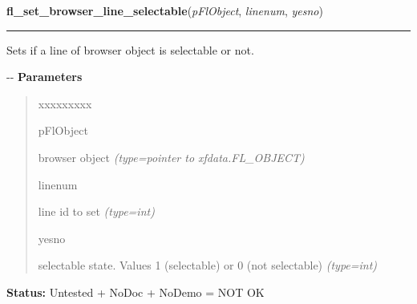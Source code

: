 \hspace{.8\funcindent}\begin{boxedminipage}{\funcwidth}

    \raggedright \textbf{fl\_set\_browser\_line\_selectable}(\textit{pFlObject}, \textit{linenum}, \textit{yesno})

    \vspace{-1.5ex}

    \rule{\textwidth}{0.5\fboxrule}
\setlength{\parskip}{2ex}

Sets if a line of browser object is selectable or not.

-{}-
\setlength{\parskip}{1ex}
      \textbf{Parameters}
      \vspace{-1ex}

      \begin{quote}
        \begin{Ventry}{xxxxxxxxx}

          \item[pFlObject]


browser object
            {\it (type=pointer to xfdata.FL\_OBJECT)}

          \item[linenum]


line id to set
            {\it (type=int)}

          \item[yesno]


selectable state. Values 1 (selectable) or 0 (not selectable)
            {\it (type=int)}

        \end{Ventry}

      \end{quote}

\textbf{Status:} 
Untested + NoDoc + NoDemo = NOT OK


    \end{boxedminipage}

    \label{xformslib:flbrowser:fl_get_browser_dimension}

    \vspace{0.5ex}

